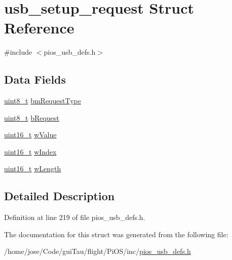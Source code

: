 \hypertarget{structusb__setup__request}{\section{usb\-\_\-setup\-\_\-request Struct Reference}
\label{structusb__setup__request}
}


{\ttfamily \#include $<$pios\-\_\-usb\-\_\-defs.\-h$>$}

\subsection*{Data Fields}
\begin{DoxyCompactItemize}
\item 
\hyperlink{stdint_8h_aba7bc1797add20fe3efdf37ced1182c5}{uint8\-\_\-t} \hyperlink{group___p_i_o_s___u_s_b___d_e_f_s_ga6724d6067f78659da89e2abac5040207}{bm\-Request\-Type}
\item 
\hyperlink{stdint_8h_aba7bc1797add20fe3efdf37ced1182c5}{uint8\-\_\-t} \hyperlink{group___p_i_o_s___u_s_b___d_e_f_s_ga55cbbe5ea2f7842c4df02bda43532cb5}{b\-Request}
\item 
\hyperlink{stdint_8h_a273cf69d639a59973b6019625df33e30}{uint16\-\_\-t} \hyperlink{group___p_i_o_s___u_s_b___d_e_f_s_ga1f14de3d7b02c5e6ba04cf9334e0d259}{w\-Value}
\item 
\hyperlink{stdint_8h_a273cf69d639a59973b6019625df33e30}{uint16\-\_\-t} \hyperlink{group___p_i_o_s___u_s_b___d_e_f_s_ga1469080fa91077cdc69a2f4dd5509974}{w\-Index}
\item 
\hyperlink{stdint_8h_a273cf69d639a59973b6019625df33e30}{uint16\-\_\-t} \hyperlink{group___p_i_o_s___u_s_b___d_e_f_s_gae0ab089c03a957e9e3a61874d5565d44}{w\-Length}
\end{DoxyCompactItemize}


\subsection{Detailed Description}


Definition at line 219 of file pios\-\_\-usb\-\_\-defs.\-h.



The documentation for this struct was generated from the following file\-:\begin{DoxyCompactItemize}
\item 
/home/jose/\-Code/gui\-Tau/flight/\-Pi\-O\-S/inc/\hyperlink{pios__usb__defs_8h}{pios\-\_\-usb\-\_\-defs.\-h}\end{DoxyCompactItemize}
